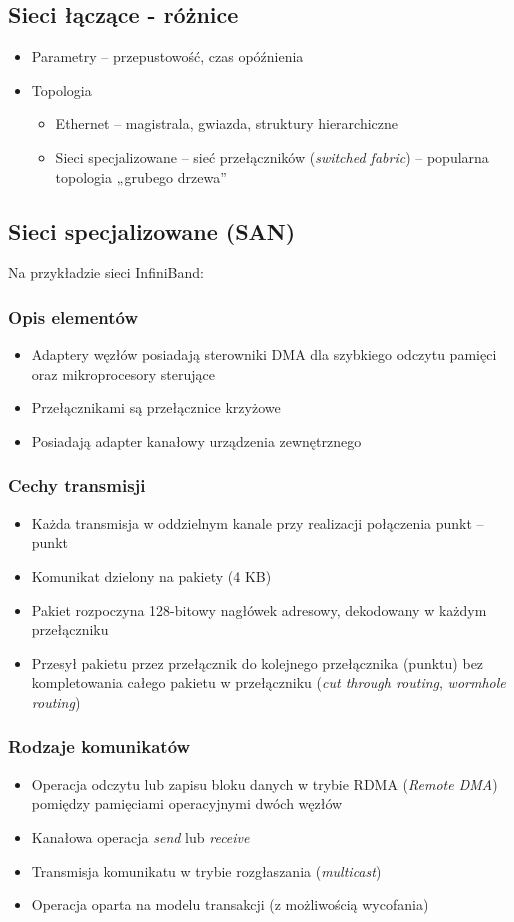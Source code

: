 \documentclass[a4paper,twoside]{article}
\begin{document}
\subsection{Sieci łączące - różnice}
\begin{itemize}
	\item Parametry – przepustowość, czas opóźnienia
	\item Topologia
	\begin{itemize}
		\item Ethernet – magistrala, gwiazda, struktury hierarchiczne
		\item Sieci specjalizowane – sieć przełączników (\textit{switched fabric}) – popularna topologia „grubego drzewa”
	\end{itemize}
\end{itemize}
\subsection{Sieci specjalizowane (SAN)}
Na przykładzie sieci InfiniBand:
\subsubsection{Opis elementów}
\begin{itemize}
	\item Adaptery węzłów posiadają sterowniki DMA dla szybkiego odczytu pamięci oraz mikroprocesory sterujące
	\item Przełącznikami są przełącznice krzyżowe
	\item Posiadają adapter kanałowy urządzenia zewnętrznego
\end{itemize}
\subsubsection{Cechy transmisji}
\begin{itemize}
	\item Każda transmisja w oddzielnym kanale przy realizacji połączenia punkt – punkt
	\item Komunikat dzielony na pakiety (4 KB)
	\item Pakiet rozpoczyna 128-bitowy nagłówek adresowy, dekodowany w każdym przełączniku
	\item Przesył pakietu przez przełącznik do kolejnego przełącznika (punktu) bez kompletowania całego pakietu w przełączniku (\emph{cut through routing}, \emph{wormhole routing})
\end{itemize}
\subsubsection{Rodzaje komunikatów}
\begin{itemize}
	\item Operacja odczytu lub zapisu bloku danych w trybie RDMA (\emph{Remote DMA}) pomiędzy pamięciami operacyjnymi dwóch węzłów
	\item Kanałowa operacja \emph{send} lub \emph{receive}
	\item Transmisja komunikatu w trybie rozgłaszania (\emph{multicast})
	\item Operacja oparta na modelu transakcji (z możliwością wycofania)
\end{itemize}
\end{document}
